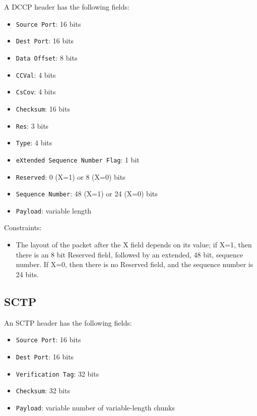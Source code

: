 \documentclass[10pt,a4paper]{article}
\begin{document}
A DCCP header has the following fields:
\begin{itemize}
\item \texttt{Source Port}: 16 bits
\item \texttt{Dest Port}: 16 bits
\item \texttt{Data Offset}: 8 bits
\item \texttt{CCVal}: 4 bits
\item \texttt{CsCov}: 4 bits
\item \texttt{Checksum}: 16 bits
\item \texttt{Res}: 3 bits
\item \texttt{Type}: 4 bits
\item \texttt{eXtended Sequence Number Flag}: 1 bit
\item \texttt{Reserved}: 0 (X=1) or 8 (X=0) bits
\item \texttt{Sequence Number}: 48 (X=1) or 24 (X=0) bits
\item \texttt{Payload}: variable length
\end{itemize}

Constraints:
\begin{itemize}
\item The layout of the packet after the X field depends on its value; if X=1, then there
is an 8 bit Reserved field, followed by an extended, 48 bit, sequence number. If X=0, then
there is no Reserved field, and the sequence number is 24 bits.
\end{itemize}

\subsection{SCTP}

An SCTP header has the following fields:
\begin{itemize}
\item \texttt{Source Port}: 16 bits
\item \texttt{Dest Port}: 16 bits
\item \texttt{Verification Tag}: 32 bits
\item \texttt{Checksum}: 32 bits
\item \texttt{Payload}: variable number of variable-length chunks
\end{itemize}
\end{document}
